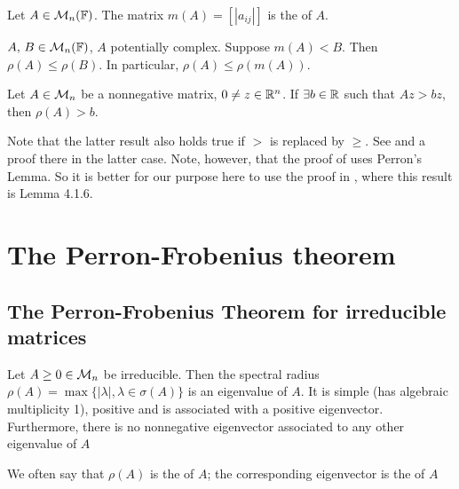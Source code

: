 \documentclass[aspectratio=169]{beamer}
\begin{document}
\begin{frame}
\begin{definition}
Let $A\in \mathcal{M}_n(\mathbb{F})$. The matrix $m(A)= [| a_{ij}|]$ is the  of $A$.
\end{definition}
\begin{lemma}
$A,\, B\in \mathcal{M}_n(\mathbb{F})$, $A$ potentially complex. Suppose $m(A)<B$. Then $\rho(A)\leq \rho(B)$. In particular, $\rho(A)\leq \rho(m(A))$.
\end{lemma}

\begin{lemma}\label{AnonnegativeB}
Let $A\in \mathcal{M}_n$ be a nonnegative matrix, $0 \neq z\in \mathbb{R}^n  $. If $\exists b\in \mathbb{R}$ such that $Az>bz$, then $\rho(A)>b$.
\end{lemma}
Note that the latter result also holds true if $>$ is replaced by $\geq$. See \cite[Theorem 8.3.2]{HornJohnson2013} and a proof there in the latter case.
Note, however, that the proof of \cite[Theorem 8.3.2]{HornJohnson2013} uses Perron's Lemma. So it is better for our purpose here to use the proof in \cite{Fiedler2008}, where this result is Lemma 4.1.6.
\end{frame}

\section{The Perron-Frobenius theorem}
\label{sec:PerronFrobenis}



\subsection{The Perron-Frobenius Theorem for irreducible matrices}
\label{sec:PF_irreducible_matrices}

\begin{frame}
\begin{theorem}\label{th:PF}
Let $A\geq 0\in \mathcal{M}_n$ be irreducible. Then the spectral radius $\rho(A)= \max \{ |\lambda|, \lambda\in \sigma(A)\}$ is an eigenvalue of $A$. It is simple (has algebraic multiplicity 1), positive and is associated with a positive eigenvector. Furthermore, there is no nonnegative eigenvector associated to any other eigenvalue of $A$
\end{theorem}
\vfill
\begin{remark}
We often say that $\rho(A)$ is the  of $A$; the corresponding eigenvector is the  of $A$
\end{remark}
\end{frame}
\end{document}
